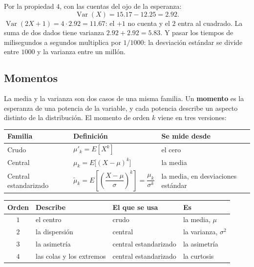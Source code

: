 \documentclass[11pt,letterpaper]{article}
\begin{document}
\begin{ejemplo}
    Por la propiedad $4$, con las cuentas del ojo de la esperanza:
    \[
        \operatorname{Var}(X) = 15.17 - 12.25 = 2.92 .
    \]
    $\operatorname{Var}(2X + 1) = 4 \cdot 2.92 = 11.67$: el $+1$ no
    cuenta y el $2$ entra al cuadrado. La suma de dos dados tiene
    varianza $2.92 + 2.92 = 5.83$. Y pasar los tiempos de milisegundos
    a segundos multiplica por $1/1000$: la desviación estándar se
    divide entre $1000$ y la varianza entre un millón.
\end{ejemplo}


\subsection*{Momentos}

La media y la varianza son dos casos de una misma familia. Un
\textbf{momento} es la esperanza de una potencia de la variable, y
cada potencia describe un aspecto distinto de la distribución. El
momento de orden $k$ viene en tres versiones:

\begin{center}
\begin{tabular}{lll}
    \toprule
    \textbf{Familia} & \textbf{Definición} & \textbf{Se mide desde} \\
    \midrule
    Crudo & $\mu'_k = E[X^k]$ & el cero \\
    Central & $\mu_k = E\big[(X - \mu)^k\big]$ & la media \\
    Central estandarizado
        & $\tilde{\mu}_k = E\left[\left(\dfrac{X - \mu}{\sigma}\right)^k
          \right] = \dfrac{\mu_k}{\sigma^k}$
        & la media, en desviaciones estándar \\
    \bottomrule
\end{tabular}
\end{center}

\begin{center}
\begin{tabular}{clll}
    \toprule
    \textbf{Orden} & \textbf{Describe} & \textbf{El que se usa}
    & \textbf{Es} \\
    \midrule
    $1$ & el centro & crudo & la media, $\mu$ \\
    $2$ & la dispersión & central & la varianza, $\sigma^2$ \\
    $3$ & la asimetría & central estandarizado & la asimetría \\
    $4$ & las colas y los extremos & central estandarizado
        & la curtosis \\
    \bottomrule
\end{tabular}
\end{center}
\end{document}
